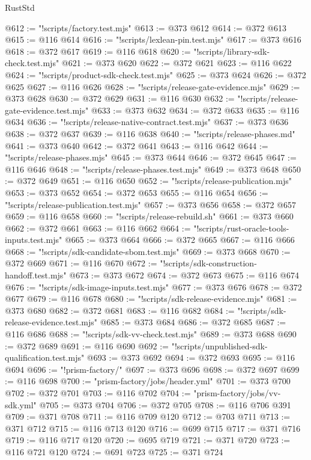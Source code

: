 \begin{lexlean}{RustStd}
\begin{coremodule}
@612 := "!scripts/factory.test.mjs"
@613 := @373 @612
@614 := @372 @613
@615 := @116 @614
@616 := "!scripts/lexlean-pin.test.mjs"
@617 := @373 @616
@618 := @372 @617
@619 := @116 @618
@620 := "!scripts/library-sdk-check.test.mjs"
@621 := @373 @620
@622 := @372 @621
@623 := @116 @622
@624 := "!scripts/product-sdk-check.test.mjs"
@625 := @373 @624
@626 := @372 @625
@627 := @116 @626
@628 := "!scripts/release-gate-evidence.mjs"
@629 := @373 @628
@630 := @372 @629
@631 := @116 @630
@632 := "!scripts/release-gate-evidence.test.mjs"
@633 := @373 @632
@634 := @372 @633
@635 := @116 @634
@636 := "!scripts/release-native-contract.test.mjs"
@637 := @373 @636
@638 := @372 @637
@639 := @116 @638
@640 := "!scripts/release-phases.md"
@641 := @373 @640
@642 := @372 @641
@643 := @116 @642
@644 := "!scripts/release-phases.mjs"
@645 := @373 @644
@646 := @372 @645
@647 := @116 @646
@648 := "!scripts/release-phases.test.mjs"
@649 := @373 @648
@650 := @372 @649
@651 := @116 @650
@652 := "!scripts/release-publication.mjs"
@653 := @373 @652
@654 := @372 @653
@655 := @116 @654
@656 := "!scripts/release-publication.test.mjs"
@657 := @373 @656
@658 := @372 @657
@659 := @116 @658
@660 := "!scripts/release-rebuild.sh"
@661 := @373 @660
@662 := @372 @661
@663 := @116 @662
@664 := "!scripts/rust-oracle-tools-inputs.test.mjs"
@665 := @373 @664
@666 := @372 @665
@667 := @116 @666
@668 := "!scripts/sdk-candidate-sbom.test.mjs"
@669 := @373 @668
@670 := @372 @669
@671 := @116 @670
@672 := "!scripts/sdk-construction-handoff.test.mjs"
@673 := @373 @672
@674 := @372 @673
@675 := @116 @674
@676 := "!scripts/sdk-image-inputs.test.mjs"
@677 := @373 @676
@678 := @372 @677
@679 := @116 @678
@680 := "!scripts/sdk-release-evidence.mjs"
@681 := @373 @680
@682 := @372 @681
@683 := @116 @682
@684 := "!scripts/sdk-release-evidence.test.mjs"
@685 := @373 @684
@686 := @372 @685
@687 := @116 @686
@688 := "!scripts/sdk-vv-check.test.mjs"
@689 := @373 @688
@690 := @372 @689
@691 := @116 @690
@692 := "!scripts/unpublished-sdk-qualification.test.mjs"
@693 := @373 @692
@694 := @372 @693
@695 := @116 @694
@696 := "!prism-factory/"
@697 := @373 @696
@698 := @372 @697
@699 := @116 @698
@700 := "prism-factory/jobs/header.yml"
@701 := @373 @700
@702 := @372 @701
@703 := @116 @702
@704 := "prism-factory/jobs/vv-sdk.yml"
@705 := @373 @704
@706 := @372 @705
@708 := @116 @706 @391
@709 := @371 @708
@711 := @116 @709 @120
@712 := @703 @711
@713 := @371 @712
@715 := @116 @713 @120
@716 := @699 @715
@717 := @371 @716
@719 := @116 @717 @120
@720 := @695 @719
@721 := @371 @720
@723 := @116 @721 @120
@724 := @691 @723
@725 := @371 @724

\end{coremodule}
\end{lexlean}
